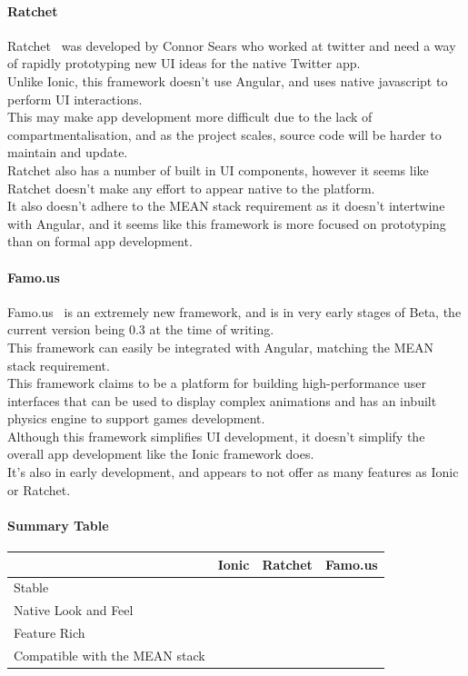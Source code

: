 \documentclass[preprint,12pt,3p]{elsarticle}
\newcommand{\checkmark}{\ding{51}}%
\newcommand{\xmark}{\ding{55}}%
\begin{document}
\paragraph{Ratchet}
Ratchet~\cite{ratchet} was developed by Connor Sears who worked at twitter and need a way of rapidly prototyping new UI ideas for the native Twitter app.\\
Unlike Ionic, this framework doesn't use Angular, and uses native javascript to perform UI interactions.\\
This may make app development more difficult due to the lack of compartmentalisation, and as the project scales, source code will be harder to maintain and update.\\
Ratchet also has a number of built in UI components, however it seems like Ratchet doesn't make any effort to appear native to the platform.\\
It also doesn't adhere to the MEAN stack requirement as it doesn't intertwine with Angular, and it seems like this framework is more focused on prototyping than on formal app development.

\paragraph{Famo.us}
Famo.us~\cite{famous} is an extremely new framework, and is in very early stages of Beta, the current version being 0.3 at the time of writing.\\
This framework can easily be integrated with Angular, matching the MEAN stack requirement.\\
This framework claims to be a platform for building high-performance user interfaces that can be used to display complex animations and has an inbuilt physics engine to support games development.\\
Although this framework simplifies UI development, it doesn't simplify the overall app development like the Ionic framework does.\\
It's also in early development, and appears to not offer as many features as Ionic or Ratchet.

\paragraph{Summary Table}
\begin{tabular}{| l | l | l | l |}
    \hline
          & Ionic & Ratchet & Famo.us \\ \hline
    Stable & \checkmark & \checkmark & \xmark\\ \hline
    Native Look and Feel & \checkmark & \xmark & \checkmark\\ \hline
    Feature Rich & \checkmark & \xmark & \xmark\\ \hline
    Compatible with the MEAN stack & \checkmark & \xmark & \checkmark\\ \hline
\end{tabular}
\end{document}
